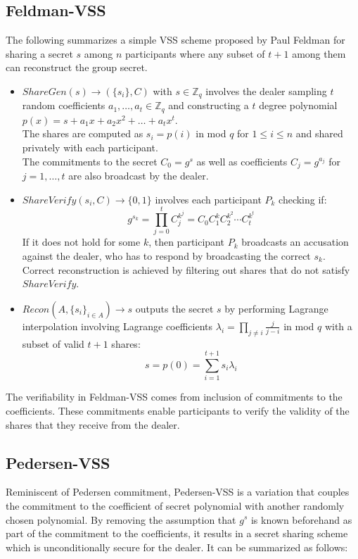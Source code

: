 \documentclass[letterpaper,twocolumn,10pt]{article}
\theoremstyle{definition}
\theoremstyle{remark}
\begin{document}
\subsection{Feldman-VSS}
\label{appendix:feldmanVSS}
The following summarizes a simple VSS scheme proposed by Paul Feldman for sharing a secret $s$ among $n$ participants where any subset of $t+1$ among them can reconstruct the group secret.
\begin{itemize}
    \item $ShareGen(s) \rightarrow (\{s_i\}, C)$ with $s \in \mathbb{Z}_q$ involves the dealer sampling $t$ random coefficients $a_1, \ldots, a_t \in \mathbb{Z}_q$ and constructing a $t$ degree polynomial $p(x) = s + a_1x+ a_2x^2 +\ldots+a_tx^t$.\\
    The shares are computed as $s_i = p(i)$ in mod $q$ for $1\le i \le n$ and shared privately with each participant.\\
    The commitments to the secret $C_0 = g^s$ as well as coefficients $C_j = g^{a_j}$ for $j = 1,\ldots,t$ are also broadcast by the dealer.
    
    \item $ShareVerify(s_i, C) \rightarrow \{0, 1\}$ involves each participant $P_k$  checking if:
    $$g^{s_k} = \prod_{j = 0}^{t } C_j^{k^j} = C_0 C_1^k C_2^{k^2} \cdots C_{t }^{k^{t }}$$
     If it does not hold for some $k$, then participant $P_k$ broadcasts an accusation against the dealer, who has to respond by broadcasting the correct $s_k$. \\
     Correct reconstruction is achieved by filtering out shares that do not satisfy $ShareVerify$.
    \item $Recon(A, \{s_i\}_{i \in A}) \rightarrow s$ outputs the secret $s$ by performing  Lagrange interpolation involving Lagrange coefficients $\lambda_i = \prod_{j \neq i} \frac{j}{j - i}$ in mod $q$ with a subset of valid $t+1$ shares:
    $$s = p(0) = \sum_{i = 1}^{t+1} s_i \lambda_i$$
\end{itemize}

The verifiability in Feldman-VSS comes from inclusion of commitments to the coefficients. These commitments enable participants to verify the validity of the shares that they receive from the dealer.

\subsection{Pedersen-VSS}
\label{appendix:pedersenVSS}
Reminiscent of Pedersen commitment, Pedersen-VSS is a variation that couples the commitment to the coefficient of secret polynomial with another randomly chosen polynomial. By removing the assumption that $g^s$ is known beforehand as part of the commitment to the coefficients, it results in a secret sharing scheme which is unconditionally secure for the dealer. It can be summarized as follows:
\end{document}
